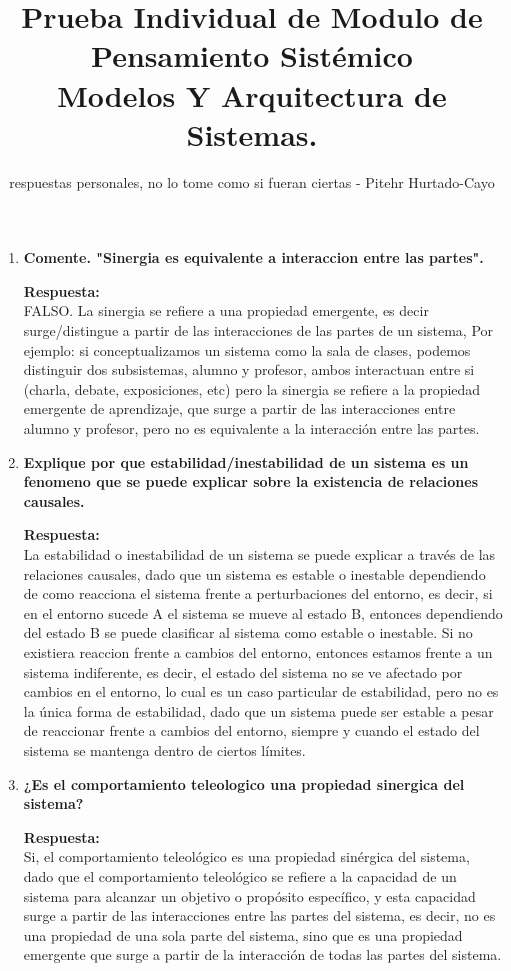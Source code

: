 \documentclass[12pt,a4paper]{article}
\title{Prueba Individual de Modulo de Pensamiento Sistémico\\
\large Modelos Y Arquitectura de Sistemas.}
\author{respuestas personales, no lo tome como si fueran ciertas - Pitehr Hurtado-Cayo}
\begin{document}
\maketitle

\begin{enumerate}[label=\textbf{Pregunta \arabic*.}]
    \item \textbf{Comente. "Sinergia es equivalente a interaccion entre las partes".}

          \textbf{Respuesta:} \\
          FALSO. La sinergia se refiere a una propiedad emergente, es decir surge/distingue a partir de las interacciones de las partes de un sistema,
          Por ejemplo: si conceptualizamos un sistema como la sala de clases, podemos distinguir dos subsistemas, alumno y profesor, ambos interactuan entre si (charla, debate, exposiciones, etc)
          pero la sinergia se refiere a la propiedad emergente de aprendizaje, que surge a partir de las interacciones entre alumno y profesor, pero no es equivalente a la interacción entre las partes.

    \item \textbf{Explique por que estabilidad/inestabilidad de un sistema es un fenomeno que se puede explicar sobre la existencia de relaciones causales.}

          \textbf{Respuesta:} \\
          La estabilidad o inestabilidad de un sistema se puede explicar a través de las relaciones causales, dado que
          un sistema es estable o inestable dependiendo de como reacciona el sistema frente a perturbaciones del entorno,
          es decir, si en el entorno sucede A el sistema se mueve al estado B, entonces dependiendo del estado B se puede clasificar al sistema como estable o inestable.
          Si no existiera reaccion frente a cambios del entorno, entonces estamos frente a un sistema indiferente, es decir, el estado del sistema no se ve afectado por cambios en el entorno, lo cual es un caso particular de estabilidad, pero no es la única forma de estabilidad, dado que un sistema puede ser estable a pesar de reaccionar frente a cambios del entorno, siempre y cuando el estado del sistema se mantenga dentro de ciertos límites.

    \item \textbf{¿Es el comportamiento teleologico una propiedad sinergica del sistema?}

          \textbf{Respuesta:} \\
          Si, el comportamiento teleológico es una propiedad sinérgica del sistema, dado que el comportamiento teleológico se refiere a la capacidad de un sistema para alcanzar un objetivo o propósito específico, y esta capacidad surge a partir de las interacciones entre las partes del sistema, es decir, no es una propiedad de una sola parte del sistema, sino que es una propiedad emergente que surge a partir de la interacción de todas las partes del sistema.


\end{enumerate}
\end{document}
